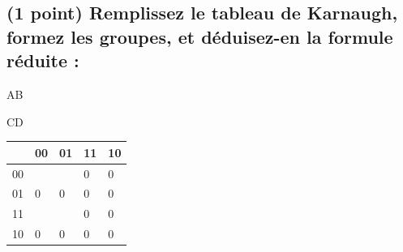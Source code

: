 \documentclass[11pt,a4paper]{article}
\begin{document}
\bigskip

\subsection{(1 point) Remplissez le tableau de Karnaugh, formez les groupes, et déduisez-en la formule réduite : }


\begin{table}[!ht]
  \centering
  \begin{minipage}{0.08\textwidth}
    \centering

\vfillFirst

AB

\vfillLast

  \end{minipage}
  \hfillx
  \begin{minipage}{0.37\textwidth}
    \centering

\begin{center}

CD

\medskip

\begin{tabular}{|C{0.75cm} || C{0.75cm}|C{0.75cm}|C{0.75cm}|C{0.75cm}|}
\hline
{} &  00 &  01 &  11 &  10 \\
\hline
\hline
  00 &   &  & 0 & 0 \\ \hline
  01 &  0 & 0 & 0 & 0 \\ \hline
  11 &   &  & 0 & 0 \\ \hline
  10 &  0 & 0 & 0 & 0 \\ \hline
\end{tabular}

\end{center}
\end{minipage}
\end{table}
\end{document}
